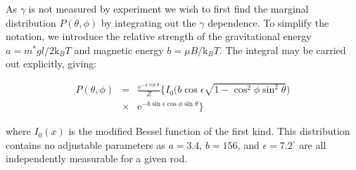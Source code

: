 \documentclass[aps,prl,twocolumn,superscriptaddress]{revtex4-1}
\newcommand{\ee}{\mathrm{e}}
\newcommand{\kk}{\mathrm{k}_B}
\begin{document}
As $\gamma$ is not measured by experiment we wish to first find the marginal distribution $P(\theta,\phi)$ by integrating out the $\gamma$ dependence. To simplify the notation, we introduce the relative strength of the gravitational energy $a=m^*gl/2 \kk T$ and magnetic energy $b=\mu B/\kk T$. The integral may be carried out explicitly, giving:


\begin{eqnarray}\label{corrected}
P(\theta,\phi)  & = & \frac{\ee^{-a\cos\theta}}{Z} \Big\{ I_0\Big( b\cos\epsilon\sqrt{1-\cos^2\phi\sin^2\theta} \Big) \nonumber\\
& \times &  \ee^{-b \sin\epsilon \cos\phi\sin\theta}\Big\} \label{P_corrected}
\end{eqnarray}

where $I_0(x)$ is the modified Bessel function of the first kind. This distribution contains no adjustable parameters as $a=3.4$, $b=156$, and $\epsilon=7.2^\circ$ are all independently measurable for a given rod.
\end{document}
